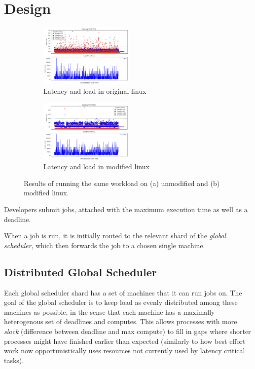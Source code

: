 \section{Design}

\begin{figure}[ht!]
    \centering
    \begin{subfigure}[t]{0.5\textwidth}
        \centering
        \includegraphics[height=1.2in]{img/old_lnx__2ms_wait__10K_iter.png}
        \caption{Latency and load in original linux}
    \end{subfigure}%
    \hfill
    \begin{subfigure}[t]{0.5\textwidth}
        \centering
        \includegraphics[height=1.2in]{img/new_lnx__2ms_wait__10K_iter.png}
        \caption{Latency and load in modified linux}
        \label{fig:graph:new}
    \end{subfigure}
    \vspace{10pt}
    \caption{Results of running the same workload on (a) unmodified and (b) modified linux.}
    \label{fig:graph}
\end{figure}

Developers submit jobs, attached with the maximum execution time as well as a
deadline. 

When a job is run, it is initially routed to the relevant shard of the
\textit{global scheduler}, which then forwards the job to a chosen
single machine. 


\subsection*{Distributed Global Scheduler}

Each global scheduler shard has a set of machines that it can run jobs on. The
goal of the global scheduler is to keep load as evenly distributed among these
machines as possible, in the sense that each machine has a maximally
heterogenous set of deadlines and computes. This allows processes with more
\textit{slack} (difference between deadline and max compute) to fill in gaps
where shorter processes might have finished earlier than expected (similarly to
how best effort work now opportunistically uses resources not currently used by
latency critical tasks).

